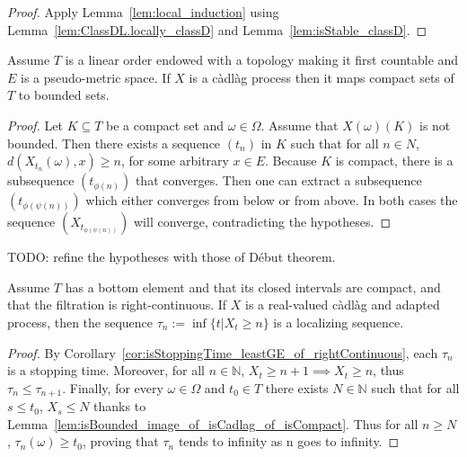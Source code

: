 \begin{proof}
  \leanok
Apply Lemma~\ref{lem:local_induction} using Lemma~\ref{lem:ClassDL.locally_classD} and Lemma~\ref{lem:isStable_classD}.
\end{proof}


\begin{lemma}\label{lem:isBounded_image_of_isCadlag_of_isCompact}
  \leanok
Assume $T$ is a linear order endowed with a topology making it first countable and $E$ is a pseudo-metric space. If $X$ is a càdlàg process then it maps compact sets of $T$ to bounded sets.
\end{lemma}

\begin{proof}\leanok
Let $K \subseteq T$ be a compact set and $\omega \in \Omega$. Assume that $X(\omega)(K)$ is not bounded. Then there exists a sequence $(t_n)$ in $K$ such that for all $n \in N$, $d(X_{t_n}(\omega), x) \ge n$, for some arbitrary $x \in E$. Because $K$ is compact, there is a subsequence $(t_{\phi(n)})$ that converges. Then one can extract a subsequence $(t_{\phi(\psi(n))})$ which either converges from below or from above. In both cases the sequence $(X_{t_{\phi(\psi(n))}})$ will converge, contradicting the hypotheses.
\end{proof}


TODO: refine the hypotheses with those of Début theorem.
\begin{lemma}\label{lem:isLocalizingSequence_leastGE}
  \leanok
Assume $T$ has a bottom element and that its closed intervals are compact, and that the filtration is right-continuous.
If $X$ is a real-valued càdlàg and adapted process, then the sequence $\tau_n := \inf \{t | X_t \ge n\}$ is a localizing sequence.
\end{lemma}

\begin{proof}
  \leanok
By Corollary~\ref{cor:isStoppingTime_leastGE_of_rightContinuous}, each $\tau_n$ is a stopping time. Moreover, for all $n \in \mathbb{N}$, $X_t \ge n+1 \implies X_t \ge n$, thus $\tau_n \le \tau_{n+1}$. Finally, for every $\omega \in \Omega$ and $t_0 \in T$ there exists $N \in \mathbb{N}$ such that for all $s \le t_0$, $X_s \le N$ thanks to Lemma~\ref{lem:isBounded_image_of_isCadlag_of_isCompact}. Thus for all $n \ge N$, $\tau_n(\omega) \ge t_0$, proving that $\tau_n$ tends to infinity as n goes to infinity.
\end{proof}


